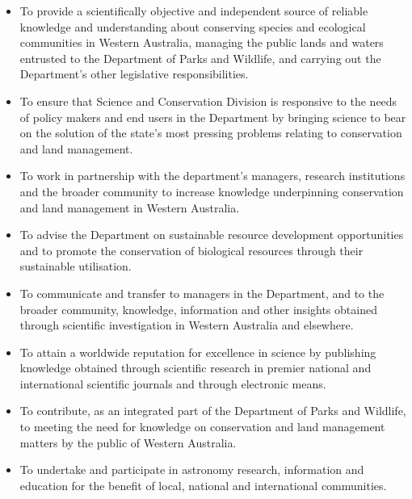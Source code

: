\documentclass[version=last, paper=a4, DIV=18, usenames, dvipsnames]{scrartcl}
\begin{document}
\begin{itemize}

  \item To provide a scientifically objective and independent source of reliable knowledge and
understanding about conserving species and ecological communities in Western Australia, managing the public lands and waters entrusted to the Department of Parks and Wildlife, and carrying out the Department's other legislative responsibilities.

  \item To ensure that Science and Conservation Division is responsive to the needs of policy makers and end users in the Department by bringing science to bear on the solution of the state's most pressing problems relating to conservation and land management.

  \item To work in partnership with the department's managers, research institutions and the broader community to increase knowledge underpinning conservation and land management in Western Australia.

  \item To advise the Department on sustainable resource development opportunities and to promote the conservation of biological resources through their sustainable utilisation.

  \item To communicate and transfer to managers in the Department, and to the broader community, knowledge, information and other insights obtained through scientific investigation in Western Australia and elsewhere.

  \item To attain a worldwide reputation for excellence in science by publishing knowledge obtained through scientific research in premier national and international scientific journals and through electronic means.

  \item To contribute, as an integrated part of the Department of Parks and Wildlife, to meeting the need for knowledge on conservation and land management matters by the public of Western Australia.

  \item To undertake and participate in astronomy research, information and education for the benefit of local, national and international communities.

\end{itemize}
\end{document}
